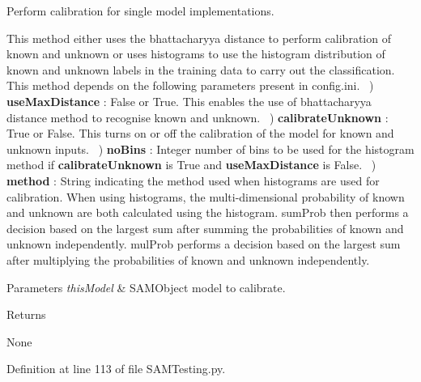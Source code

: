 Perform calibration for single model implementations. 

This method either uses the bhattacharyya distance to perform calibration of known and unknown or uses histograms to use the histogram distribution of known and unknown labels in the training data to carry out the classification. This method depends on the following parameters present in config.\+ini. ~) {\bfseries use\+Max\+Distance} \+: {\ttfamily False} or {\ttfamily True}. This enables the use of bhattacharyya distance method to recognise known and unknown. ~) {\bfseries calibrate\+Unknown} \+: {\ttfamily True} or {\ttfamily False}. This turns on or off the calibration of the model for known and unknown inputs. ~) {\bfseries no\+Bins} \+: Integer number of bins to be used for the histogram method if {\bfseries calibrate\+Unknown} is {\ttfamily True} and {\bfseries use\+Max\+Distance} is {\ttfamily False}. ~) {\bfseries method} \+: String indicating the method used when histograms are used for calibration. When using histograms, the multi-\/dimensional probability of known and unknown are both calculated using the histogram. {\ttfamily sum\+Prob} then performs a decision based on the largest sum after summing the probabilities of known and unknown independently. {\ttfamily mul\+Prob} performs a decision based on the largest sum after multiplying the probabilities of known and unknown independently.~\newline



\begin{DoxyParams}{Parameters}
{\em this\+Model} & S\+A\+M\+Object model to calibrate.\\
\hline
\end{DoxyParams}
\begin{DoxyReturn}{Returns}


None 
\end{DoxyReturn}


Definition at line 113 of file S\+A\+M\+Testing.\+py.

\mbox{\label{group__icubclient__SAM__Tests_ga2475129eb5c2e30ffe652729e98b3fc5}} 
